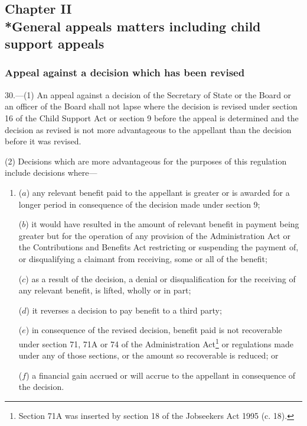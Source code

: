 \documentclass[12pt,a4paper]{article}
\begin{document}
\subsection[Chapter II --- General appeals matters including child support appeals]{Chapter II\\*General appeals matters including child support appeals}

\renewcommand\parthead{--- Part IV Chapter II}

\subsubsection[30. Appeal against a decision which has been revised]{Appeal against a decision which has been revised}

30.—(1) An appeal against a decision of the Secretary of State 
or the Board or an officer of the Board  %
shall not lapse where the decision is revised under section 16 of the Child Support Act or section 9 before the appeal is determined and the decision as revised is not more advantageous to the appellant than the decision before it was revised.

(2) Decisions which are more advantageous for the purposes of this regulation include decisions where—
\begin{enumerate}\item[]
($a$) any relevant benefit paid to the appellant is greater or is awarded for a longer period in consequence of the decision made under section 9;

($b$) it would have resulted in the amount of relevant benefit in payment being greater but for the operation of any provision of the Administration Act or the Contributions and Benefits Act restricting or suspending the payment of, or disqualifying a claimant from receiving, some or all of the benefit;

($c$) as a result of the decision, a denial or disqualification for the receiving of any relevant benefit, is lifted, wholly or in part;

($d$) it reverses a decision to pay benefit to a third party;

($e$) in consequence of the revised decision, benefit paid is not recoverable under section 71, 71A or 74 of the Administration Act\footnote{\frenchspacing Section 71A was inserted by section 18 of the Jobseekers Act 1995 (c. 18).} or regulations made under any of those sections, or the amount so recoverable is reduced; or

($f$) a financial gain accrued or will accrue to the appellant in consequence of the decision.
\end{enumerate}
\end{document}
